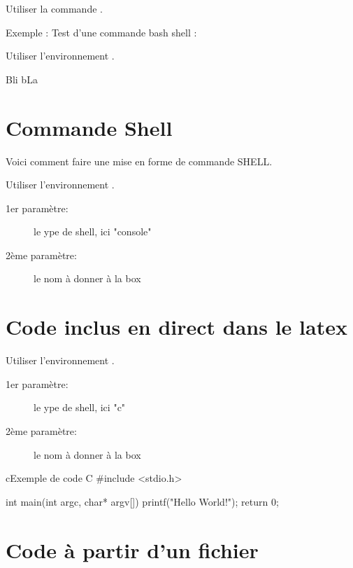 Utiliser la commande .

Exemple : Test d'une commande bash shell  : 

Utiliser l'environnement .

Bli bLa


\section{Commande Shell}
\label{sec:shell}

Voici comment faire une mise en forme de commande SHELL.

Utiliser l'environnement .
\begin{description}
 \item[1er paramètre:] le ype de shell, ici "console"
 \item[2ème paramètre:] le nom à donner à la box
\end{description}



\section{Code inclus en direct dans le latex}

Utiliser l'environnement .
\begin{description}
 \item[1er paramètre:] le ype de shell, ici "c"
 \item[2ème paramètre:] le nom à donner à la box
\end{description}

\begin{sourcebox}{c}{Exemple de code C}
#include <stdio.h>

int main(int argc, char* argv[])
{
   printf("Hello World!\n");
   return 0;
}
\end{sourcebox}



\section{Code à partir d'un fichier}

